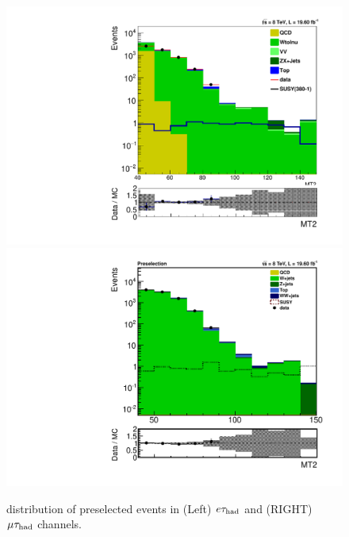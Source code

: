 \begin{figure}[htbp]
\centering
\includegraphics[angle=0,scale=0.35]{SelectionEleTau/MT2.pdf}
\includegraphics[angle=0,scale=0.35]{SelectionMuTau/MT2_muTau.pdf}
\caption{\mttwo distribution of preselected events in (Left) $e\tau_{\rm had}$ and (RIGHT) $\mu\tau_{\rm had}$ channels.}
\label{fig:mt2leptontau}
\end{figure}

